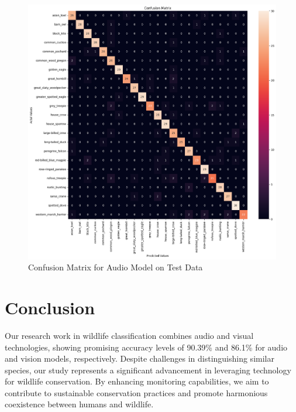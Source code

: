 \documentclass[fleqn, 10pt, twoside]{IOEGC}
\begin{document}
\begin{figure}[t] %
	\centering
	\begin{minipage}{\textwidth} %
		\includegraphics[scale=0.4]{Graphics/audio_cm.png} %
		\caption{Confusion Matrix for Audio Model on Test Data}
		\label{cm_audio}
	\end{minipage}
\end{figure}



\clearpage
\section{Conclusion}
Our research work in wildlife classification combines audio and visual technologies, showing promising accuracy levels of 90.39\% and 86.1\% for audio and vision models, respectively. Despite challenges in distinguishing similar species, our study represents a significant advancement in leveraging technology for wildlife conservation. By enhancing monitoring capabilities, we aim to contribute to sustainable conservation practices and promote harmonious coexistence between humans and wildlife.
\end{document}
